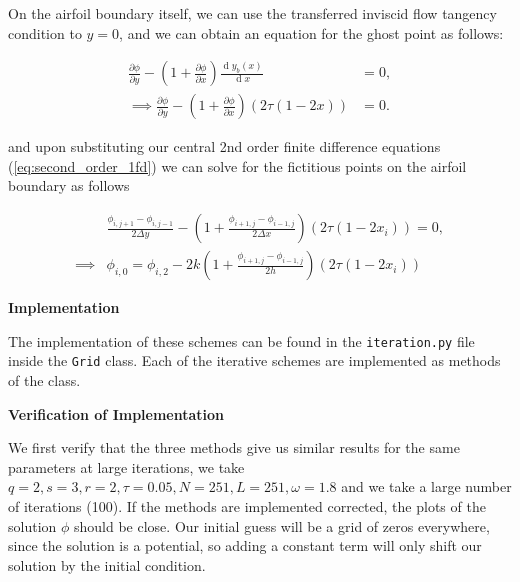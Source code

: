 \documentclass[12pt]{article}
\renewcommand{\d}[1]{\ensuremath{\operatorname{d}\!{#1}}}
\begin{document}
    On the airfoil boundary itself, we can use the transferred inviscid flow tangency condition to $y=0$, and we can obtain an equation for the ghost point as follows:

    \begin{align*}
        \frac{\partial \phi}{\partial y} - \left(1 + \frac{\partial \phi}{\partial x}\right) \frac{\d y_b(x)}{\d x} &= 0, \\
        \implies \frac{\partial \phi}{\partial y} - \left(1 + \frac{\partial \phi}{\partial x}\right)(2\tau(1 - 2x)) &= 0.
    \end{align*}

    and upon substituting our central 2nd order finite difference equations  (\ref{eq:second_order_1fd}) we can solve for the fictitious points on the airfoil boundary as follows

    \begin{align*}
        &\frac{\phi_{i, j+1} - \phi_{i, j-1}}{2\Delta y} - \left( 1 + \frac{\phi_{i+1, j} - \phi_{i-1, j}}{2\Delta x}\right)(2\tau(1 - 2x_i)) = 0, \\
        \implies &\phi_{i, 0} = \phi_{i, 2} - 2k\left(1 + \frac{\phi_{i+1, j} - \phi_{i-1, j}}{2h}\right)(2\tau(1 - 2x_i))
    \end{align*}

    \textbf{Implementation}

    The implementation of these schemes can be found in the \texttt{iteration.py} file inside the \texttt{Grid} class. Each of the iterative schemes are implemented as methods of the class.

    \newpage
    \textbf{Verification of Implementation}

    We first verify that the three methods give us similar results for the same parameters at large iterations, we take $q=2, s=3, r=2, \tau=0.05, N = 251, L = 251, \omega = 1.8$ and we take a large number of iterations (100). If the methods are implemented corrected, the plots of the solution $\phi$ should be close. Our initial guess will be a grid of zeros everywhere, since the solution is a potential, so adding a constant term will only shift our solution by the initial condition.
\end{document}

